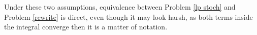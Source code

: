 \documentclass{amsart}
\begin{document}
\noindent Under these two assumptions, equivalence between Problem \ref{lp stoch} and Problem \ref{rewrite} is direct, even though it may look harsh, as both terms inside the integral converge then it is a matter of notation.
\end{document}
